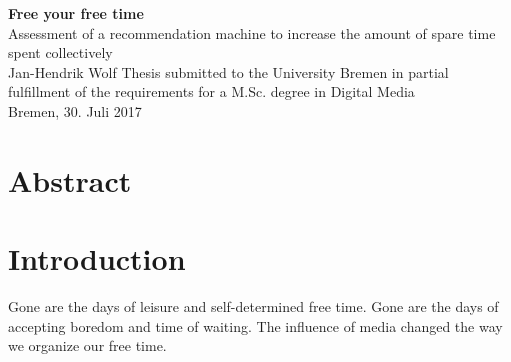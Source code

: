 \documentclass[12pt,numbers=noenddot,parskip,bibliography=totocnumbered,listof=totocnumbered]{scrreprt}
\begin{document}
	
\begin{titlepage}
\null
\vfill


\Huge\textsf{\textbf{Free your free time
\vspace{0.5em}}}\\
\LARGE\textsf{ Assessment of a recommendation machine to increase 
the amount of
spare time spent collectively 
} \vspace{1.5em}\\
\Large\textsf{Jan-Hendrik Wolf}
\vfill
\vfill
\vfill
\small{Thesis submitted to the University Bremen in partial fulfillment of the requirements for a M.Sc. degree in Digital Media\\
Bremen, 30. Juli 2017}
\end{titlepage}


\tableofcontents

\chapter*{Abstract}

\chapter{Introduction}



Gone are the days of leisure and self-determined free time. Gone are the days of accepting boredom and time of waiting. The influence of media changed the way we organize our free time.  
\end{document}
